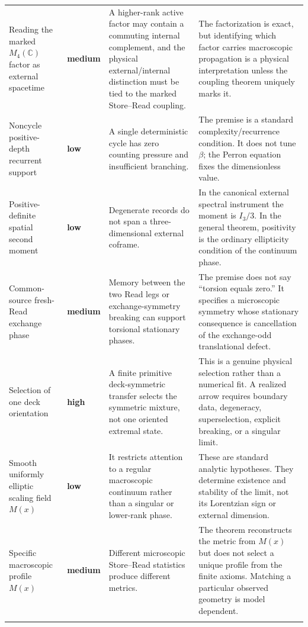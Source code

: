 \documentclass[11pt]{article}
\theoremstyle{definition}
\theoremstyle{remark}
\newcommand{\C}{\mathbb C}
\newcommand{\lowrisk}{\textcolor{deepgreen}{\textbf{low}}}
\newcommand{\mediumrisk}{\textcolor{deepblue}{\textbf{medium}}}
\newcommand{\highrisk}{\textcolor{deepred}{\textbf{high}}}
\begin{document}
\begin{longtable}{L{0.25\textwidth}L{0.13\textwidth}L{0.26\textwidth}L{0.28\textwidth}}
Reading the marked $M_4(\C)$ factor as external spacetime
& \mediumrisk
& A higher-rank active factor may contain a commuting internal complement, and the physical external/internal distinction must be tied to the marked Store--Read coupling.
& The factorization is exact, but identifying which factor carries macroscopic propagation is a physical interpretation unless the coupling theorem uniquely marks it. \\
\addlinespace

Noncycle positive-depth recurrent support
& \lowrisk
& A single deterministic cycle has zero counting pressure and insufficient branching.
& The premise is a standard complexity/recurrence condition.  It does not tune $\beta$; the Perron equation fixes the dimensionless value. \\
\addlinespace

Positive-definite spatial second moment
& \lowrisk
& Degenerate records do not span a three-dimensional external coframe.
& In the canonical external spectral instrument the moment is $I_3/3$.  In the general theorem, positivity is the ordinary ellipticity condition of the continuum phase. \\
\addlinespace

Common-source fresh-Read exchange phase
& \mediumrisk
& Memory between the two Read legs or exchange-symmetry breaking can support torsional stationary phases.
& The premise does not say ``torsion equals zero.''  It specifies a microscopic symmetry whose stationary consequence is cancellation of the exchange-odd translational defect. \\
\addlinespace

Selection of one deck orientation
& \highrisk
& A finite primitive deck-symmetric transfer selects the symmetric mixture, not one oriented extremal state.
& This is a genuine physical selection rather than a numerical fit.  A realized arrow requires boundary data, degeneracy, superselection, explicit breaking, or a singular limit. \\
\addlinespace

Smooth uniformly elliptic scaling field $M(x)$
& \lowrisk
& It restricts attention to a regular macroscopic continuum rather than a singular or lower-rank phase.
& These are standard analytic hypotheses.  They determine existence and stability of the limit, not its Lorentzian sign or external dimension. \\
\addlinespace

Specific macroscopic profile $M(x)$
& \mediumrisk
& Different microscopic Store--Read statistics produce different metrics.
& The theorem reconstructs the metric from $M(x)$ but does not select a unique profile from the finite axioms.  Matching a particular observed geometry is model dependent. \\
\addlinespace


\end{longtable}
\end{document}

